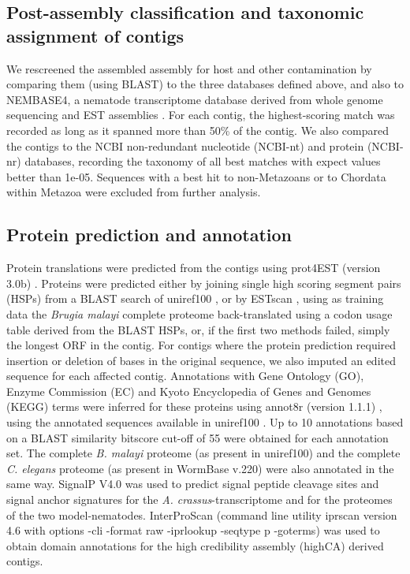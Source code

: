 \documentclass[10pt]{bmc_article}
\newenvironment{bmcformat}{\begin{raggedright}\baselineskip20pt\sloppy\setboolean{publ}{false}}{\end{raggedright}\baselineskip20pt\sloppy}
\begin{document}
\begin{bmcformat}
\subsection*{Post-assembly classification and taxonomic assignment of
  contigs}

We rescreened the assembled assembly for host and other contamination
by comparing them (using BLAST) to the three databases defined above,
and also to NEMBASE4, a nematode transcriptome database derived from
whole genome sequencing and EST assemblies
\cite{parkinson_nembase:resource_2004, pmid21550347}. For each contig,
the highest-scoring match was recorded as long as it spanned more than
50\% of the contig. We also compared the contigs to the NCBI
non-redundant nucleotide (NCBI-nt) and protein (NCBI-nr) databases,
recording the taxonomy of all best matches with expect values better
than 1e-05. Sequences with a best hit to non-Metazoans or to Chordata
within Metazoa were excluded from further analysis.


\subsection*{Protein prediction and annotation}

Protein translations were predicted from the contigs using prot4EST
(version 3.0b) \cite{wasmuth_prot4est:_2004}. Proteins were predicted
either by joining single high scoring segment pairs (HSPs) from a
BLAST search of uniref100 \cite{pmid18836194}, or by ESTscan
\cite{estscan}, using as training data the \textit{Brugia malayi}
complete proteome back-translated using a codon usage table derived
from the BLAST HSPs, or, if the first two methods failed, simply the
longest ORF in the contig. For contigs where the protein prediction
required insertion or deletion of bases in the original sequence, we
also imputed an edited sequence for each affected contig. Annotations
with Gene Ontology (GO), Enzyme Commission (EC) and Kyoto Encyclopedia
of Genes and Genomes (KEGG) terms were inferred for these proteins
using annot8r (version 1.1.1) \cite{schmid_annot8r:_2008}, using the
annotated sequences available in uniref100 \cite{pmid18836194}. Up to
10 annotations based on a BLAST similarity bitscore cut-off of 55 were
obtained for each annotation set. The complete \textit{B. malayi}
proteome (as present in uniref100) and the complete
\textit{C. elegans} proteome (as present in WormBase v.220) were also
annotated in the same way. SignalP V4.0 \cite{pmid21959131} was used
to predict signal peptide cleavage sites and signal anchor signatures
for the \textit{A. crassus}-transcriptome and for the proteomes of the
two model-nematodes. InterProScan \cite{pmid11590104} (command line
utility iprscan version 4.6 with options -cli -format raw -iprlookup
-seqtype p -goterms) was used to obtain domain annotations for the
high credibility assembly (highCA) derived contigs.


\end{bmcformat}
\end{document}
